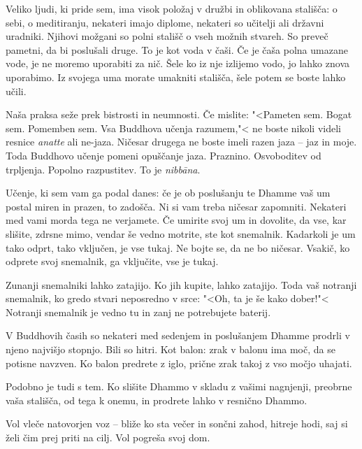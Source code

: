 \clearpage


Veliko ljudi, ki pride sem, ima visok položaj v družbi in oblikovana stališča: o sebi, o meditiranju, nekateri imajo diplome, nekateri so učitelji ali državni uradniki. Njihovi možgani so polni stališč o vseh možnih stvareh. So preveč pametni, da bi poslušali druge. To je kot voda v čaši. Če je čaša polna umazane vode, je ne moremo uporabiti za nič. Šele ko iz nje izlijemo vodo, jo lahko znova uporabimo. Iz svojega uma morate umakniti stališča, šele potem se boste lahko učili.

Naša praksa seže prek bistrosti in neumnosti. Če mislite: "<Pameten sem. Bogat sem. Pomemben sem. Vsa Buddhova učenja razumem,"< ne boste nikoli videli resnice \emph{anatte} ali ne-jaza. Ničesar drugega ne boste imeli razen jaza – jaz in moje. Toda Buddhovo učenje pomeni opuščanje jaza. Praznino. Osvoboditev od trpljenja. Popolno razpustitev. To je \emph{nibbāna}.

\clearpage


Učenje, ki sem vam ga podal danes: če je ob poslušanju te Dhamme vaš um postal miren in prazen, to zadošča. Ni si vam treba ničesar zapomniti. Nekateri med vami morda tega ne verjamete. Če umirite svoj um in dovolite, da vse, kar slišite, zdrsne mimo, vendar še vedno motrite, ste kot snemalnik. Kadarkoli je um tako odprt, tako vključen, je vse tukaj. Ne bojte se, da ne bo ničesar. Vsakič, ko odprete svoj snemalnik, ga vključite, vse je tukaj.

Zunanji snemalniki lahko zatajijo. Ko jih kupite, lahko zatajijo. Toda vaš notranji snemalnik, ko gredo stvari neposredno v srce: "<Oh, ta je še kako dober!"< Notranji snemalnik je vedno tu in zanj ne potrebujete baterij.

\clearpage


V Buddhovih časih so nekateri med sedenjem in poslušanjem Dhamme prodrli v njeno najvišjo stopnjo. Bili so hitri. Kot balon: zrak v balonu ima moč, da se potisne navzven. Ko balon predrete z iglo, prične zrak takoj z vso močjo uhajati.

Podobno je tudi s tem. Ko slišite Dhammo v skladu z vašimi nagnjenji, preobrne vaša stališča, od tega k onemu, in prodrete lahko v resnično Dhammo.


Vol vleče natovorjen voz – bliže ko sta večer in sončni zahod, hitreje hodi, saj si želi čim prej priti na cilj. Vol pogreša svoj dom.

